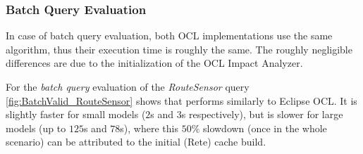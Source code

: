 \subsubsection{Batch Query Evaluation}
In case of batch query evaluation, both OCL implementations use the same
algorithm, thus their execution time is roughly the same. The roughly negligible
differences are due to the initialization of the OCL Impact Analyzer.

For the \emph{batch query} evaluation of the \emph{RouteSensor} query
\autoref{fig:BatchValid_RouteSensor} shows that \incquery{} performs similarly
to Eclipse OCL. It is slightly faster for small models ($2$s and $3$s
respectively), but is slower for large models (up to $125$s and $78$s), where
this $50\%$ slowdown (once in the whole scenario) can be attributed to the
initial (Rete) cache build.


